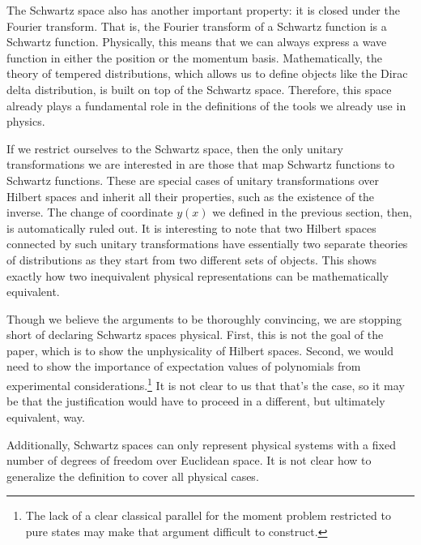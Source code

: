 \documentclass[10pt,twocolumn, nofootinbib]{revtex4-2}
\begin{document}
The Schwartz space also has another important property: it is closed under the Fourier transform. That is, the Fourier transform of a Schwartz function is a Schwartz function. Physically, this means that we can always express a wave function in either the position or the momentum basis. Mathematically, the theory of tempered distributions, which allows us to define objects like the Dirac delta distribution, is built on top of the Schwartz space. Therefore, this space already plays a fundamental role in the definitions of the tools we already use in physics.

If we restrict ourselves to the Schwartz space, then the only unitary transformations we are interested in are those that map Schwartz functions to Schwartz functions. These are special cases of unitary transformations over Hilbert spaces and inherit all their properties, such as the existence of the inverse. The change of coordinate $y(x)$ we defined in the previous section, then, is automatically ruled out. It is interesting to note that two Hilbert spaces connected by such unitary transformations have essentially two separate theories of distributions as they start from two different sets of objects. This shows exactly how two inequivalent physical representations can be mathematically equivalent.

Though we believe the arguments to be thoroughly convincing, we are stopping short of declaring Schwartz spaces physical. First, this is not the goal of the paper, which is to show the unphysicality of Hilbert spaces. Second, we would need to show the importance of expectation values of polynomials from experimental considerations.\footnote{The lack of a clear classical parallel for the moment problem restricted to pure states may make that argument difficult to construct.} It is not clear to us that that's the case, so it may be that the justification would have to proceed in a different, but ultimately equivalent, way.

Additionally, Schwartz spaces can only represent physical systems with a fixed number of degrees of freedom over Euclidean space. It is not clear how to generalize the definition to cover all physical cases.
\end{document}
